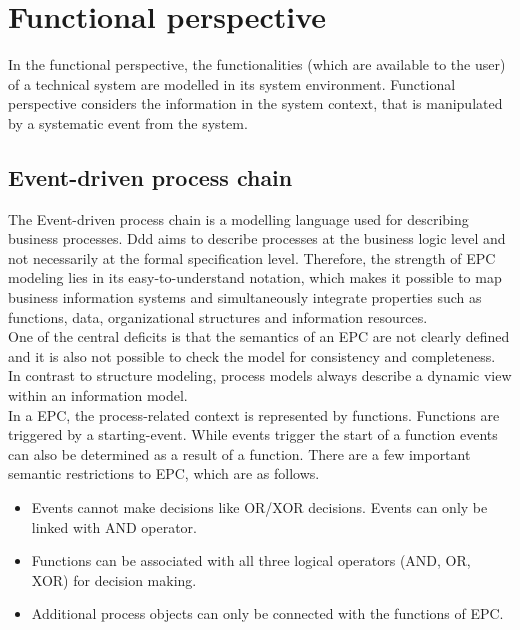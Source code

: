 \newpage
\section{Functional perspective}
In the functional perspective, the functionalities (which are available to the user) of a technical system are modelled in its system environment. Functional perspective considers the information in the system context, that is manipulated by a systematic event from the system.



\subsection{Event-driven process chain}
The Event-driven process chain is a modelling language used for describing business processes. \gls{Ddd} aims to describe processes at the business logic level and not necessarily at the formal specification level. \cite{G.KellerM.NuttgensA.W.Scheer.Januar1992} Therefore, the strength of EPC modeling lies in its easy-to-understand notation, which makes it possible to map business information systems and simultaneously integrate properties such as functions, data, organizational structures and information resources.\cite{Benker.2016} \\
One of the central deficits is that the semantics of an EPC are not clearly defined and it is also not possible to check the model for consistency and completeness. \cite{Krogstie.2012} In contrast to structure modeling, process models always describe a dynamic view within an information model.\cite{G.KellerM.NuttgensA.W.Scheer.Januar1992} \\
In a EPC, the process-related context is represented by functions. Functions are triggered by a starting-event. While events trigger the start of a function events can also be determined as a result of a function. There are a few important semantic restrictions to EPC, which are as follows.\cite{MuhammadWaseemAnwar.March132018}

\begin{itemize}
	\item  
	Events cannot make decisions like OR/XOR decisions.
	Events can only be linked with AND operator.
	\item 
	Functions can be associated with all three logical operators
	(AND, OR, XOR) for decision making.
	\item 
	Additional process objects can only be connected with
	the functions of EPC.
\end{itemize}


